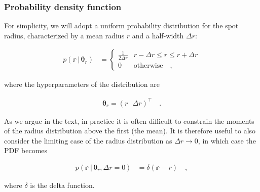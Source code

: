 \documentclass[modern,linenumbers]{aastex62}
\begin{document}
\subsubsection{Probability density function}
%
For simplicity, we will adopt a uniform probability distribution for the
spot radius, characterized by a mean radius $r$ and a half-width $\Delta r$:
%
\begin{linenomath}\begin{align}
        p(\mathbb{r} \, \big| \, \pmb{\theta}_{r})
         & =
        \begin{cases}
            \frac{1}{2\Delta r} & r - \Delta r \leq r \leq r + \Delta r
            \\
            0                   & \mathrm{otherwise}
            \quad,
        \end{cases}
    \end{align}\end{linenomath}
%
where the hyperparameters of the distribution are
%
\begin{linenomath}\begin{align}
        \pmb{\theta}_r = \left(
        r \, \, \, \,
        \Delta r \right)^\top
        \quad.
    \end{align}\end{linenomath}
%
As we argue in the text, in practice it is often difficult to constrain the
moments of the radius distribution above the first (the mean). It is
therefore useful to also consider the limiting case of the radius distribution
as $\Delta r \rightarrow 0$, in which case the PDF becomes
%
\begin{linenomath}\begin{align}
        p(\mathbb{r} \, \big| \, \pmb{\theta}_{r}, \Delta r = 0)
         & =
        \delta(\mathbb{r} - r)
        \quad,
    \end{align}\end{linenomath}
%
where $\delta$ is the delta function.
%
\end{document}

